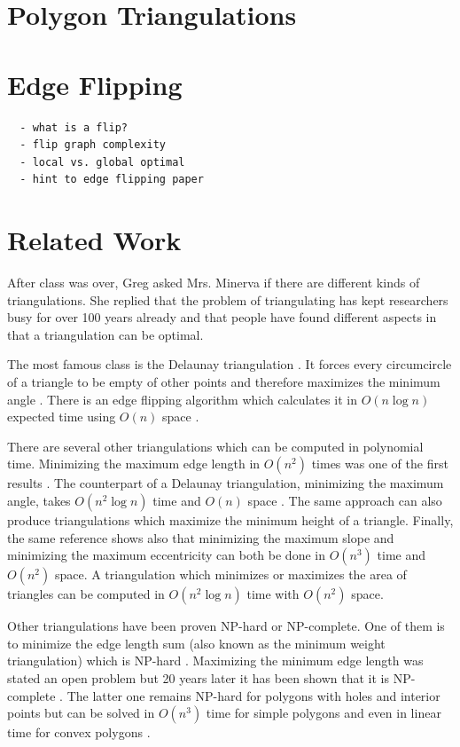 \section{Polygon Triangulations}

\section{Edge Flipping}
\begin{verbatim}
  - what is a flip?
  - flip graph complexity
  - local vs. global optimal
  - hint to edge flipping paper
\end{verbatim}

\section{Related Work}
After class was over, Greg asked Mrs. Minerva if there are different
kinds of triangulations. She replied that the problem of 
triangulating has kept researchers busy for over 100 years already
\cite{triangulation_hilbert} and that people have found different
aspects in that a triangulation can be optimal.

The most famous class is the Delaunay triangulation
\cite[Section 9.2]{deberg_compgeom}. It forces every circumcircle
of a triangle to be empty of other points and therefore maximizes
the minimum angle \cite[Theorem 9.9]{deberg_compgeom}. There is an
edge flipping algorithm which calculates it in \(O(n \log n)\) 
expected time using \(O(n)\) space 
\cite[Theorem 9.12]{deberg_compgeom}.

There are several other triangulations which can be computed in
polynomial time. Minimizing the maximum edge length in \(O(n^2)\)
times was one of the first results \cite{triangulation_minmax_length}.
The counterpart of a Delaunay triangulation, 
minimizing the maximum angle, takes \(O(n^2 \log n)\) time and
\(O(n)\) space \cite{triangulation_edge_insertion}. The same
approach can also produce triangulations which maximize the minimum 
height of a triangle. Finally, the same reference shows also that 
minimizing the maximum slope and minimizing the maximum eccentricity 
can both be done in \(O(n^3)\) time and \(O(n^2)\) space. A 
triangulation which minimizes or maximizes the area of triangles can
be computed in \(O(n^2 \log n)\) time with \(O(n^2)\) space.
\cite{triangulation_area}

Other triangulations have been proven NP-hard or NP-complete. One
of them is to minimize the edge length sum (also known as the minimum
weight triangulation) which is NP-hard \cite{mwt_complexity}. 
Maximizing the minimum edge length was stated an open problem
\cite{triangulation_minmax_length} but 20 years later it has been
shown that it is NP-complete \cite{mmlt_complexity}. The latter one
remains NP-hard for polygons with holes and interior points
\cite{mmlt_polygons} but can be solved in \(O(n^3)\) time for simple
polygons and even in linear time for convex polygons
\cite{mmlt_convex_polygons}.

